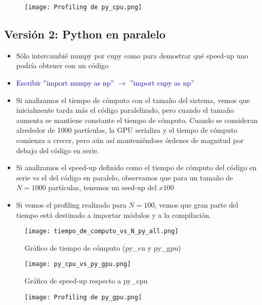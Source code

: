 \documentclass[aps,prb,twocolumn,superscriptaddress,floatfix,longbibliography]{revtex4-2}
\newcounter{para}
\begin{document}
\begin{itemize}
\begin{figure}[h]
    \texttt{[image: Profiling de py\_cpu.png]}
    \caption{}
     \label{fig:Profiling de py_cpu}
\end{figure}


\subsection{Versión 2: Python en paralelo}

\begin{itemize}
    \item Sólo intercambié numpy por cupy como para demostrar qué speed-up uno podría obtener con un código 
    \item \textcolor{blue}{Escribir ''import numpy as np'' $\rightarrow$ ''import cupy as np''}
    \item Si analizamos el tiempo de cómputo con el tamaño del sistema, vemos que inicialmente tarda más el código paralelizado, pero cuando el tamaño aumenta se mantiene constante el tiempo de cómputo. Cuando se consideran alrededor de 1000 partículas, la GPU serializa y el tiempo de cómputo comienza a crecer, pero aún así manteniéndose órdenes de magnitud por debajo del código en serie.
    \item Si analizamos el speed-up definido como el tiempo de cómputo del código en serie vs el del código en paralelo, observamos que para un tamaño de $N = 1000$ partículas, tenemos un seed-up del $x100$ 
    \item Si vemos el profiling realizado para $N = 100$, vemos que gran parte del tiempo está destinado a importar módulos y a la compilación.
\end{itemize}



\begin{figure}[h]
    \texttt{[image: tiempo\_de\_computo\_vs\_N\_py\_all.png]}
    \caption{Gráfico de tiempo de cómputo (py_cu y py_gpu)}
     \label{fig:tiempo_de_computo_vs_N_py_all}
\end{figure}

\begin{figure}[h]
    \texttt{[image: py\_cpu\_vs\_py\_gpu.png]}
    \caption{Gráfico de speed-up respecto a py_cpu}
     \label{fig:py_cpu_vs_py_gpu}
\end{figure}

\begin{figure}[h]
    \texttt{[image: Profiling de py\_gpu.png]}
    \caption{}
     \label{fig:Profiling de py_gpu}
\end{figure}





\end{itemize}
\end{document}
